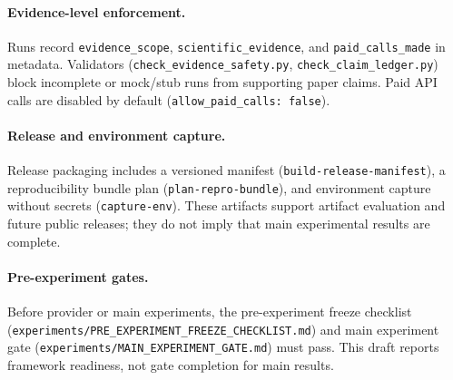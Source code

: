 \paragraph{Evidence-level enforcement.}
Runs record \texttt{evidence\_scope}, \texttt{scientific\_evidence}, and \texttt{paid\_calls\_made} in metadata. Validators (\texttt{check\_evidence\_safety.py}, \texttt{check\_claim\_ledger.py}) block incomplete or mock/stub runs from supporting paper claims. Paid API calls are disabled by default (\texttt{allow\_paid\_calls: false}).

\paragraph{Release and environment capture.}
Release packaging includes a versioned manifest (\texttt{build-release-manifest}), a reproducibility bundle plan (\texttt{plan-repro-bundle}), and environment capture without secrets (\texttt{capture-env}). These artifacts support artifact evaluation and future public releases; they do not imply that main experimental results are complete.

\paragraph{Pre-experiment gates.}
Before provider or main experiments, the pre-experiment freeze checklist (\texttt{experiments/PRE\_EXPERIMENT\_FREEZE\_CHECKLIST.md}) and main experiment gate (\texttt{experiments/MAIN\_EXPERIMENT\_GATE.md}) must pass. This draft reports framework readiness, not gate completion for main results.
